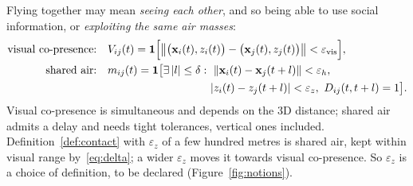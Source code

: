 \begin{remark}\label{rem:notions}
Flying together may mean \emph{seeing each other}, and so being able to use social information,
or \emph{exploiting the same air masses}:
\begin{align*}
  \text{visual co-presence:}\quad & V_{ij}(t) = \ind\Bigl[\bigl\|\bigl(\x_i(t),z_i(t)\bigr)-\bigl(\x_j(t),z_j(t)\bigr)\bigr\|<\varepsilon_\vis\Bigr],\\
  \text{shared air:}\quad & m_{ij}(t) = \ind\bigl[\exists\, |l|\le\delta:\ \|\x_i(t)-\x_j(t+l)\|<\varepsilon_h,\\
  & \hphantom{m_{ij}(t) = \ind\bigl[\exists\, |l|\le\delta:\ }|z_i(t)-z_j(t+l)|<\varepsilon_z,\ D_{ij}(t,t+l)=1\bigr].
\end{align*}
Visual co-presence is simultaneous and depends on the 3D distance; shared air admits a delay and
needs tight tolerances, vertical ones included. Definition~\ref{def:contact} with $\varepsilon_z$
of a few hundred metres is shared air, kept within visual range by~\eqref{eq:delta}; a wider
$\varepsilon_z$ moves it towards visual co-presence. So $\varepsilon_z$ is a choice of definition,
to be declared (Figure~\ref{fig:notions}).
\end{remark}

